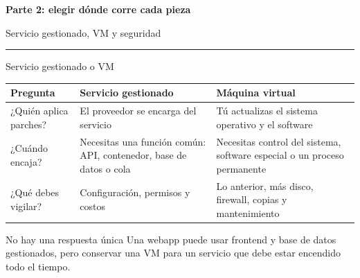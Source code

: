 \documentclass[aspectratio=169,10pt,c]{beamer}
\newcommand{\separador}[2]{%
\begin{frame}[plain]
\vfill
\begin{center}
{\fontsize{29}{34}\selectfont\bfseries #1}\par
\vspace{2mm}
{\small #2}\par
\vspace{4mm}
{\color{utpRojo}\rule{8.5cm}{1.2pt}}
\end{center}
\vfill
\end{frame}}
\begin{document}
\separador{Parte 2: elegir dónde corre cada pieza}{Servicio gestionado, VM y seguridad}

\begin{frame}{Servicio gestionado o VM}
\renewcommand{\arraystretch}{1.35}
\centering\small
\begin{tabular}{@{}p{3.2cm}p{4.45cm}p{4.75cm}@{}}
\toprule
\textbf{Pregunta} & \textbf{Servicio gestionado} & \textbf{Máquina virtual}\\
\midrule
¿Quién aplica parches? & El proveedor se encarga del servicio & Tú actualizas el sistema operativo y el software\\
¿Cuándo encaja? & Necesitas una función común: API, contenedor, base de datos o cola & Necesitas control del sistema, software especial o un proceso permanente\\
¿Qué debes vigilar? & Configuración, permisos y costos & Lo anterior, más disco, firewall, copias y mantenimiento\\
\bottomrule
\end{tabular}
\par\vspace{3mm}
\begin{exampleblock}{No hay una respuesta única}
\small Una webapp puede usar frontend y base de datos gestionados, pero conservar una VM para un servicio que debe estar encendido todo el tiempo.
\end{exampleblock}
\end{frame}
\end{document}
